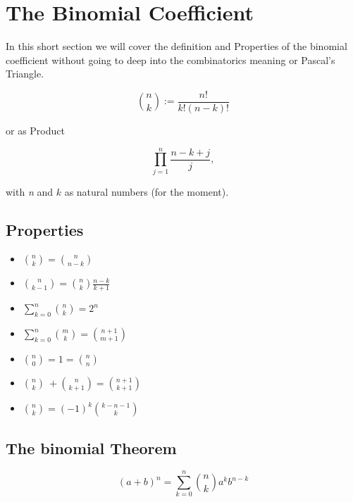 \newpage
\section{The Binomial Coefficient}

In this short section we will cover the definition and Properties of the binomial coefficient
without going to deep into the combinatorics meaning or Pascal's Triangle.

\[
    \binom{n}{k} := \frac{n!}{k!(n-k)!}
\]

or as Product

\[
    \prod_{j = 1}^{n} \frac{n-k+j}{j},
\]

with \emph{n} and \(k\) as natural numbers (for the moment).

\subsection{Properties}

\begin{itemize}
    
    \item \( \binom{n}{k} =  \binom{n}{n - k}\)
    
    \item \( \binom{n}{k - 1} = \binom{n}{k} \frac{n - k}{k + 1}\)
    
    \item \( \sum_{k = 0}^{n} \binom{n}{k} = 2^n\) 
    
    \item \( \sum_{k = 0}^{n} \binom{m}{k} = \binom{n + 1}{m + 1}\) 
    
    \item \(\binom{n}{0} = 1 = \binom{n}{n}\)
    
    \item \(\binom{n}{k}\ + \binom{n}{k + 1} = \binom{n + 1}{k + 1}\)
    
    \item \(\binom{n}{k} = {(-1)}^k \binom{k - n - 1}{k}\)

\end{itemize}

\subsection{The binomial Theorem}

\[
    {(a + b)}^{n} =\sum_{k = 0}^{n}\binom{n}{k}a^k b^{n - k}
\]



